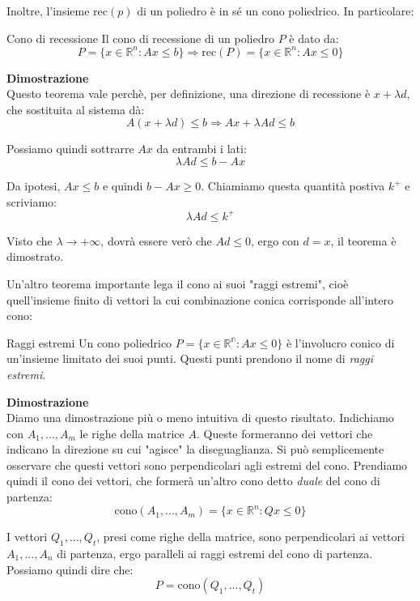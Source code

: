\documentclass[a4paper,11pt]{article}
\begin{document}
Inoltre, l'insieme $\mathrm{rec}(p)$ di un poliedro è in sé un cono poliedrico. In particolare: 

\begin{theorem}{Cono di recessione}	
Il cono di recessione di un poliedro $P$ è dato da:
$$
P = \{ x \in \mathbb{R}^n : Ax \leq b \} \Rightarrow \mathrm{rec}(P) = \{ x \in \mathbb{R}^n : Ax \leq 0 \}
$$
\end{theorem}

\par\medskip
\noindent
\textbf{\textsf{Dimostrazione}} \\
Questo teorema vale perchè, per definizione, una direzione di recessione è $x + \lambda d$, che sostituita al sistema dà:
$$
A(x + \lambda d) \leq b \Rightarrow Ax + \lambda Ad \leq b
$$

Possiamo quindi sottrarre $Ax$ da entrambi i lati:
$$
\lambda Ad \leq b - Ax
$$

Da ipotesi, $Ax \leq b$ e quindi $b - Ax \geq 0$.
Chiamiamo questa quantità postiva $k^+$ e scriviamo:
$$
\lambda Ad \leq k^+
$$

Visto che $\lambda \rightarrow +\infty$, dovrà essere verò che $Ad \leq 0$, ergo con $d = x$, il teorema è dimostrato.

\par\medskip

Un'altro teorema importante lega il cono ai suoi "raggi estremi", cioè quell'insieme finito di vettori la cui combinazione conica corrisponde all'intero cono:
\begin{theorem}{Raggi estremi}
	Un cono poliedrico $P = \{ x \in \mathbb{R^n} : Ax \leq 0 \}$ è l'involucro conico di un'insieme limitato dei suoi punti. Questi punti prendono il nome di \textit{raggi estremi}.
\end{theorem}

\par\medskip
\noindent
\textbf{\textsf{Dimostrazione}} \\
Diamo una dimostrazione più o meno intuitiva di questo risultato.
Indichiamo con $A_1, ..., A_m$ le righe della matrice $A$. 
Queste formeranno dei vettori che indicano la direzione su cui "agisce" la diseguaglianza.
Si può semplicemente osservare che questi vettori sono perpendicolari agli estremi del cono.
Prendiamo quindi il cono dei vettori, che formerà un'altro cono detto \textit{duale} del cono di partenza:
$$
\mathrm{cono}(A_1, ..., A_m) = \{ x \in \mathbb{R}^n : Qx \leq 0 \}
$$

I vettori $Q_1, ..., Q_t$, presi come righe della matrice, sono perpendicolari ai vettori $A_1, ..., A_n$ di partenza, ergo paralleli ai raggi estremi del cono di partenza.
Possiamo quindi dire che:
$$
P = \mathrm{cono}(Q_1, ..., Q_t)
$$
\end{document}
